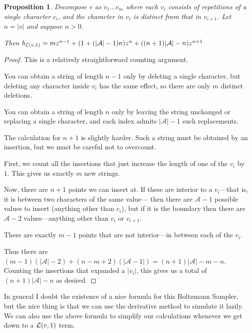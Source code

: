 \documentclass[a4paper]{book}
\newtheorem{proposition}{Proposition}[section]
\begin{document}
\begin{proposition}
Decompose \(v\) as \(v_1 \ldots v_m\) where each \(v_i\) consists of repetitions of a single character \(c_i\),
and the character in \(v_i\) is distinct from that in \(v_{i + 1}\).
Let \(n = |v|\) and suppose \(n > 0\).

Then \(b_{\mathcal{L} (v, 1)} = m z^{n - 1} + (1 + (|\mathcal{A}| - 1)n) z^{n} + ((n + 1) |\mathcal{A}| - n) z^{n + 1}\)
\end{proposition}

\begin{proof}
This is a relatively straightforward counting argument.

You can obtain a string of length \(n - 1\) only by deleting a single character,
but deleting any character inside \(v_i\) has the same effect,
so there are only \(m\) distinct deletions.

You can obtain a string of length \(n\) only by leaving the string unchanged or replacing a single character,
and each index admits \(|\mathcal{A}| - 1\) such replacements.

The calculation for \(n + 1\) is slightly harder.
Such a string must be obtained by an insertion,
but we must be careful not to overcount.

First,
we count all the insertions that just increase the length of one of the \(v_i\) by \(1\).
This gives us exactly \(m\) new strings.

Now, there are \(n + 1\) points we can insert at.
If these are interior to a \(v_i\)---that is,
it is between two characters of the same value---
then there are \(\mathcal{A} - 1\) possible values to insert (anything other than \(c_i\)),
but if it is the boundary then there are  \(\mathcal{A} - 2\) values---anything
other than \(c_i\) or \(c_{i + 1}\).

There are exactly \(m - 1\) points that are not interior---in
between each of the \(v_i\).

Thus there are \((m - 1)(|\mathcal{A}| - 2) + (n - m + 2)(|\mathcal{A} - 1|) = (n + 1) |\mathcal{A}| - m - n\).
Counting the insertions that expanded a \(|v_i|\),
this gives us a total of \((n + 1) |\mathcal{A}| - n\) as desired.
\end{proof}

In general I doubt the existence of a nice formula for this Boltzmann Sampler,
but the nice thing is that we can use the derivative method to simulate it lazily.
We can also use the above formula to simplify our calculations whenever we get down to a \(\mathcal{L} (v, 1)\) term.
\end{document}
